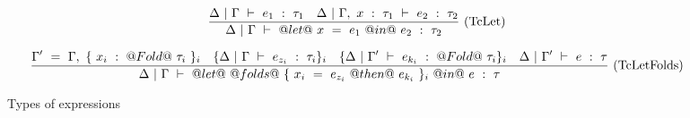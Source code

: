 \begin{figure*}
$$
\enskip \frac {\displaystyle 
    \Delta~|~\Gamma ~\vdash~ e_1~:~\tau_1
    \quad
    \Delta~|~\Gamma,~x~:~\tau_1 ~\vdash~ e_2~:~\tau_2
} {\displaystyle 
    \Delta~|~\Gamma ~\vdash~ @let@~x~=~e_1~@in@~e_2~:~\tau_2
} \  \mbox{(TcLet)} \enskip
$$

$$
\enskip \frac {\displaystyle 
    \Gamma'~=~\Gamma,~\{~x_i~:~@Fold@~\tau_i~\}_i
    \quad
    \{
    \Delta~|~\Gamma ~\vdash~ e_{z_i}~:~\tau_i
    \}_i
    \quad
    \{
    \Delta~|~\Gamma' ~\vdash~ e_{k_i}~:~@Fold@~\tau_i
    \}_i
    \quad
    \Delta~|~\Gamma' ~\vdash~ e~:~\tau
} {\displaystyle 
    \Delta~|~\Gamma ~\vdash~ @let@~@folds@~\{~x_i~=~e_{z_i}~@then@~e_{k_i}~\}_i~@in@~e~:~\tau
} \  \mbox{(TcLetFolds)} \enskip
$$


\caption{Types of expressions}
\label{fig:source:type:exp}
\end{figure*}

